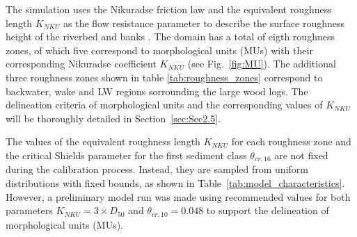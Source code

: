 \documentclass[draft,linenumbers,onecolumn]{agujournal2019} %
\begin{document}
The simulation uses the Nikuradse friction law and the equivalent roughness length \(K_{NKU}\) as the flow resistance parameter to describe the surface roughness height of the riverbed and banks \cite{nikuradse1933stroemungsgesetze,marriott2010hydraulic,webber2018fluid,hervouet2020telemac2d}. The domain has a total of eigth roughness zones, of which five correspond to morphological units (MUs) with their corresponding Nikuradse coefficient \(K_{NKU}\) (see Fig.~\ref{fig:MU}). The additional three roughness zones shown in table \ref{tab:roughness_zones} correspond to backwater, wake and LW regions sorrounding the large wood logs. The delineation criteria of morphological units and the corresponding values of \( K_{NKU} \) will be thoroughly detailed in Section~\ref{sec:Sec2.5}.


The values of the equivalent roughness length \(K_{NKU}\) for each roughness zone and the critical Shields parameter for the first sediment class \( \theta_{cr,16} \) are not fixed during the calibration process. Instead, they are sampled from uniform distributions with fixed bounds, as shown in Table~\ref{tab:model_characteristics}. However, a preliminary model run was made using recommended values for both parameters \( K_{NKU} = 3 \times D_{50} \) and \( \theta_{cr,10} = 0.048 \) to support the delineation of morphological units (MUs).


%
%

\end{document}
